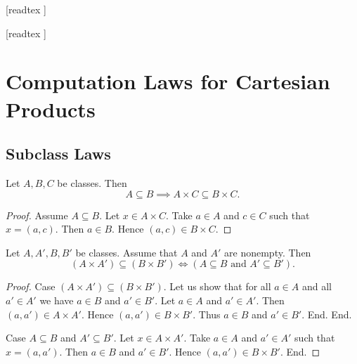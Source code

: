 \documentclass[10pt]{article}
\begin{document}
  \begin{imports}
    \begin{forthel}

      [readtex ]

      [readtex ]

    \end{forthel}
  \end{imports}

  \section{Computation Laws for Cartesian Products}

  \subsection{Subclass Laws}

  \begin{forthel}
    \begin{proposition}
      Let $A, B, C$ be classes.
      Then \[ A \subseteq B \implies A \times C \subseteq B \times C. \]
    \end{proposition}
    \begin{proof}
      Assume $A \subseteq B$.
      Let $x \in A \times C$.
      Take $a \in A$ and $c \in C$ such that $x = (a, c)$.
      Then $a \in B$.
      Hence $(a, c) \in B \times C$.
    \end{proof}
  \end{forthel}

  \begin{forthel}
    \begin{proposition}
      Let $A, A', B, B'$ be classes.
      Assume that $A$ and $A'$ are nonempty.
      Then \[ (A \times A') \subseteq (B \times B') \iff
      (\text{$A \subseteq B$ and $A' \subseteq B'$}). \]
    \end{proposition}
    \begin{proof}
      Case $(A \times A') \subseteq (B \times B')$.
        Let us show that for all $a \in A$ and all $a' \in A'$ we have $a \in B$
        and $a' \in B'$.
          Let $a \in A$ and $a' \in A'$.
          Then $(a, a') \in A \times A'$.
          Hence $(a, a') \in B \times B'$.
          Thus $a \in B$ and $a' \in B'$.
        End.
      End.

      Case $A \subseteq B$ and $A' \subseteq B'$.
        Let $x \in A \times A'$.
        Take $a \in A$ and $a' \in A'$ such that $x = (a, a')$.
        Then $a \in B$ and $a' \in B'$.
        Hence $(a, a') \in B \times B'$.
      End.
    \end{proof}
  \end{forthel}
\end{document}
